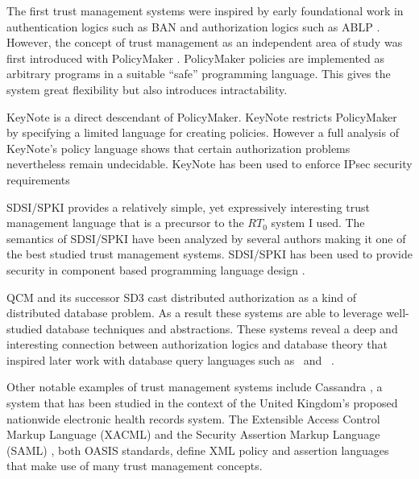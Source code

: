 
The first trust management systems were inspired by early foundational work in authentication
logics such as BAN \cite{Burrows:LA} and authorization logics such as ABLP \cite{Abadi:CACDS}.
However, the concept of trust management as an independent area of study was first introduced
with PolicyMaker \cite{Blaze:DTM,Blaze:CCPTMS}. PolicyMaker policies are implemented as
arbitrary programs in a suitable ``safe'' programming language. This gives the system great
flexibility but also introduces intractability.

KeyNote \cite{RFC-2704} is a direct descendant of PolicyMaker. KeyNote restricts PolicyMaker by
specifying a limited language for creating policies. However a full analysis of KeyNote's policy
language \cite{Li:DCFTML} shows that certain authorization problems nevertheless remain
undecidable. KeyNote has been used to enforce IPsec security requirements
\cite{Blaze:TMIPS,Blaze:EKTMS}

SDSI/SPKI \cite{Rivest:SDSI-11,RFC-2693} provides a relatively simple, yet expressively
interesting trust management language that is a precursor to the $RT_0$ system I used. The
semantics of SDSI/SPKI have been analyzed by several authors
\cite{Abadi:OSLLNS,Halpern:LSSLLNS,Howell:FSS,Li:LNSS,Clarke:CCDSS} making it one of the best
studied trust management systems. SDSI/SPKI has been used to provide security in component based
programming language design \cite{Liu:CSI}.

QCM \cite{Gunter:DALSI,Gunter:GCR} and its successor SD3 \cite{Jim:STMSCE,Jim:DDQE} cast
distributed authorization as a kind of distributed database problem. As a result these systems
are able to leverage well-studied database techniques and abstractions. These systems reveal a
deep and interesting connection between authorization logics and database theory that inspired
later work with database query languages such as \datalog\ and \datalogc\ \cite{Li:DCFTML}.

Other notable examples of trust management systems include Cassandra \cite{Becker:CFTMAEHR}, a
system that has been studied in the context of the United Kingdom's proposed nationwide
electronic health records system. The Extensible Access Control Markup Language (XACML)
\cite{OASIS:XACMLTC} and the Security Assertion Markup Language (SAML) \cite{OASIS:SSTC}, both
OASIS standards, define XML policy and assertion languages that make use of many trust
management concepts.


